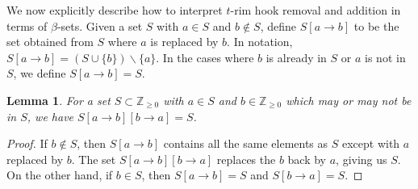 \documentclass[12pt]{amsart}
\newtheorem{lemma}[theorem]{Lemma}
\theoremstyle{definition}
\numberwithin{equation}{section}
\begin{document}
We now explicitly describe how to interpret $t$-rim hook removal and addition in terms of {$\beta$-sets}. Given a set $S$ with $a\in S$ and $b\not\in S$, define $S[a\to b]$ to be the set obtained from $S$ where $a$ is replaced by $b$. In notation, $S[a\to b] = (S\cup \{b\})\backslash\{a\}$. In the cases where $b$ is already in $S$ or $a$ is not in $S$, we define $S[a\to b] = S$. 
\begin{lemma}\label{lem:double-replacement}
    For a set $S\subset \mathbb{Z}_{\geq 0}$ with $a\in S$ and $b\in \mathbb{Z}_{\geq 0}$ which may or may not be in $S$, we have
$S[a\to b][b\to a] = S$.
\end{lemma}
\begin{proof}
    If $b\not\in S$, then $S[a\to b]$ contains all the same elements as $S$ except with $a$ replaced by $b$. The set $S[a\to b][b\to a]$ replaces the $b$ back by $a$, giving us $S$. On the other hand, if $b\in S$, then $S[a\to b] = S$ and $S[b\to a] = S$.
\end{proof}
\end{document}
